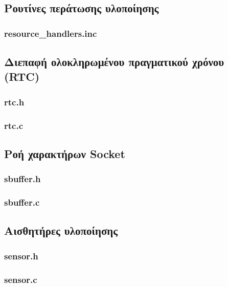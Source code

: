 \subsection*{Ρουτίνες περάτωσης υλοποίησης}
\subsubsection*{resource\_handlers.inc}



\subsection*{Διεπαφή ολοκληρωμένου πραγματικού χρόνου (RTC)}
\subsubsection*{rtc.h}

\subsubsection*{rtc.c}



\subsection*{Ροή χαρακτήρων Socket}
\subsubsection*{sbuffer.h}

\subsubsection*{sbuffer.c}



\subsection*{Αισθητήρες υλοποίησης}
\subsubsection*{sensor.h}

\subsubsection*{sensor.c}



